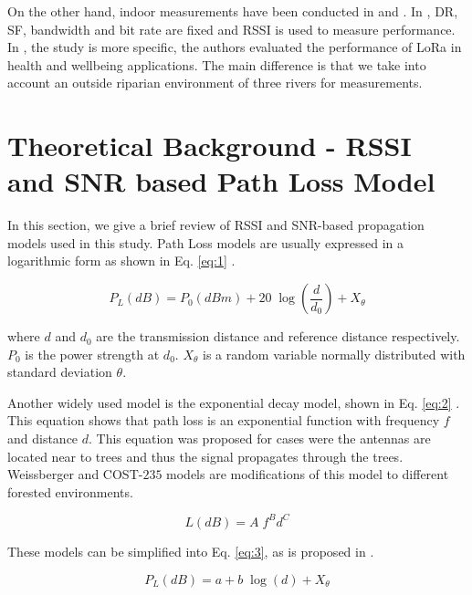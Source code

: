On the other hand, indoor measurements have been conducted in \cite{Gregora2016} and \cite{Petajajarvi2016}. In \cite{Gregora2016}, DR, SF, bandwidth and bit rate are fixed and RSSI is used to measure performance. In \cite{Petajajarvi2016}, the study is more specific, the authors evaluated the performance of LoRa in health and wellbeing applications. The main difference is that we take into account an outside riparian environment of three rivers for measurements.

\section{Theoretical Background - RSSI and SNR based Path Loss Model}
\label{sec:theory}
In this section, we give a brief review of RSSI and SNR-based propagation models used in this study. Path Loss models are usually expressed in a logarithmic form as shown in Eq. \eqref{eq:1} \cite{Iswandi2017}.

\begin{equation} 
\label{eq:1}
P_L(dB) = P_0(dBm) + 20\;\log\left(\frac{d}{d_0}\right)+X_\theta
\end{equation}  

where $d$ and $d_0$ are the transmission distance and reference distance respectively. $P_0$ is the power strength at $d_0$. $X_\theta$ is a random variable normally distributed with standard deviation $\theta$.

Another widely used model is the exponential decay model, shown in Eq. \eqref{eq:2} \cite{RamaRao2012}. This equation shows that path loss is an exponential function with frequency $f$ and distance $d$. This equation was proposed for cases were the antennas are located near to trees and thus the signal propagates through the trees. Weissberger and COST-$235$ models are modifications of this model to different forested environments.

\begin{equation}
\label{eq:2}
L(dB) = A\; f^{B}d^{C}
\end{equation} 

These models can be simplified into Eq. \eqref{eq:3}, as is proposed in \cite{Iswandi2017}.

\begin{equation}
\label{eq:3}
P_L(dB) = a + b\;\log(d)+X_\theta
\end{equation}

